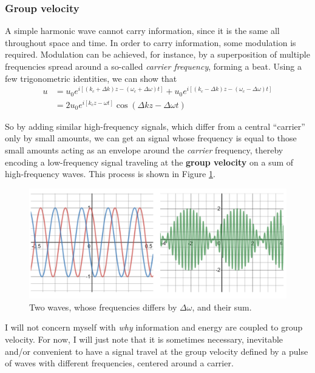 \subsubsection*{Group velocity}

A simple harmonic wave cannot carry information, since it is the same all throughout space and time. In order to carry information, some modulation is required. Modulation can be achieved, for instance, by a superposition of multiple frequencies spread around a so-called \textit{carrier frequency}, forming a beat. Using a few trigonometric identities, we can show that
\begin{align*}
    u&=u_0e^{i[(k_c+\Delta k)z-(\omega_c+\Delta\omega)t]}+u_0e^{i[(k_c-\Delta k)z-(\omega_c-\Delta\omega)t]}\\
    &=2u_0e^{i[k_cz-\omega t]}\cos(\Delta kz-\Delta\omega t)
\end{align*}

So by adding similar high-frequency signals, which differ from a central ``carrier'' only by small amounts, we can get an signal whose frequency is equal to those small amounts acting as an envelope around the \textit{carrier} frequency, thereby encoding a low-frequency signal traveling at the\textbf{ group velocity} on a sum of high-frequency waves. This process is shown in Figure \ref{fig:wave.packet}.

\begin{figure}[h]
    \centering
    \includegraphics[width=0.45\linewidth]{Figuras/wave packet (1).png}
    \caption{Two waves, whose frequencies differs by $\Delta\omega$, and their sum.}
    \label{fig:wave.packet}
\end{figure}

I will not concern myself with \textit{why} information and energy are coupled to group velocity. For now, I will just note that it is sometimes necessary, inevitable and/or convenient to have a signal travel at the group velocity defined by a pulse of waves with different frequencies, centered around a carrier.


